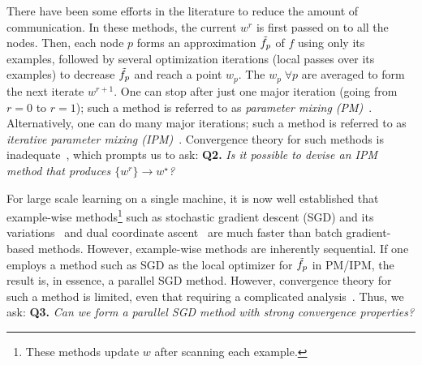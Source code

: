There have been some efforts in the literature to reduce the amount of communication. In these methods, the current $w^r$ is first passed on to all the nodes. Then, each node $p$ forms an approximation $\tilde{f}_p$ of $f$ using only its examples, followed by several optimization iterations (local passes over its examples) to decrease $\tilde{f}_p$ and reach a point $w_p$. The $w_p\;\forall p$ are averaged to form the next iterate $w^{r+1}$. One can stop after just one major iteration (going from $r=0$ to $r=1$); such a method is referred to as {\it parameter mixing (PM)}~\cite{mann2009}. Alternatively, one can do many major iterations; such a method is referred to as {\it iterative parameter mixing (IPM)}~\cite{hall2010}. Convergence theory for such methods is inadequate~\cite{mann2009, mcdonald2010}, which prompts us to ask: {\bf Q2.} {\it Is it possible to devise an IPM method that produces $\{w^r\} \rightarrow w^\star$?}

For large scale learning on a single machine, it is now well established that example-wise methods\footnote{These methods update $w$ after scanning each example.} such as stochastic gradient descent (SGD) and its variations~\cite{bottou2010, johnson2013} and dual coordinate ascent~\cite{hsieh2008} are much faster than batch gradient-based methods. However, example-wise methods are inherently sequential. If one employs a method such as SGD as the local optimizer for $\tilde{f}_p$ in PM/IPM, the result is, in essence, a parallel SGD method. However, convergence theory for such a method is limited, even that requiring a complicated analysis~\cite{zinkevich2010}. Thus, we ask: {\bf Q3.} {\it Can we form a parallel SGD method with strong convergence properties?}

